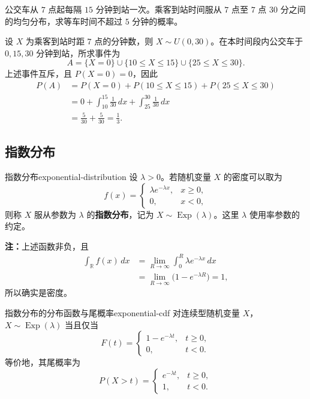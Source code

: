 \begin{example}[等公交车不超过五分钟]
公交车从 $7$ 点起每隔 $15$ 分钟到站一次。乘客到站时间服从 $7$ 点至 $7$ 点 $30$ 分之间的均匀分布，求等车时间不超过 $5$ 分钟的概率。

设 $X$ 为乘客到站时距 $7$ 点的分钟数，则 $X\sim U(0,30)$。在本时间段内公交车于 $0,15,30$ 分钟到站，所求事件为
\[
A=\{X=0\}\cup\{10\leq X\leq15\}\cup\{25\leq X\leq30\}.
\]
上述事件互斥，且 $P(X=0)=0$，因此
\[
\begin{aligned}
P(A)
&=P(X=0)+P(10\leq X\leq15)+P(25\leq X\leq30)\\
&=0+\int_{10}^{15}\frac1{30}\,dx+\int_{25}^{30}\frac1{30}\,dx\\
&=\frac5{30}+\frac5{30}=\frac13.
\end{aligned}
\]
\end{example}

\subsection*{指数分布}

\begin{mydefinition}{指数分布}{exponential-distribution}
设 $\lambda>0$。若随机变量 $X$ 的密度可以取为
\[
f(x)=
\begin{cases}
\lambda e^{-\lambda x},&x\geq0,\\
0,&x<0,
\end{cases}
\]
则称 $X$ 服从参数为 $\lambda$ 的\textbf{指数分布}，记为 $X\sim\operatorname{Exp}(\lambda)$。这里 $\lambda$ 使用率参数的约定。
\end{mydefinition}

\textbf{注：}\quad 上述函数非负，且
\[
\begin{aligned}
\int_{\mathbb R}f(x)\,dx
&=\lim_{R\to\infty}\int_0^R\lambda e^{-\lambda x}\,dx\\
&=\lim_{R\to\infty}\bigl(1-e^{-\lambda R}\bigr)=1,
\end{aligned}
\]
所以确实是密度。

\begin{proposition}{指数分布的分布函数与尾概率}{exponential-cdf}
对连续型随机变量 $X$，$X\sim\operatorname{Exp}(\lambda)$ 当且仅当
\[
F(t)=
\begin{cases}
1-e^{-\lambda t},&t\geq0,\\
0,&t<0.
\end{cases}
\]
等价地，其尾概率为
\[
P(X>t)=
\begin{cases}
e^{-\lambda t},&t\geq0,\\
1,&t<0.
\end{cases}
\]
\end{proposition}

